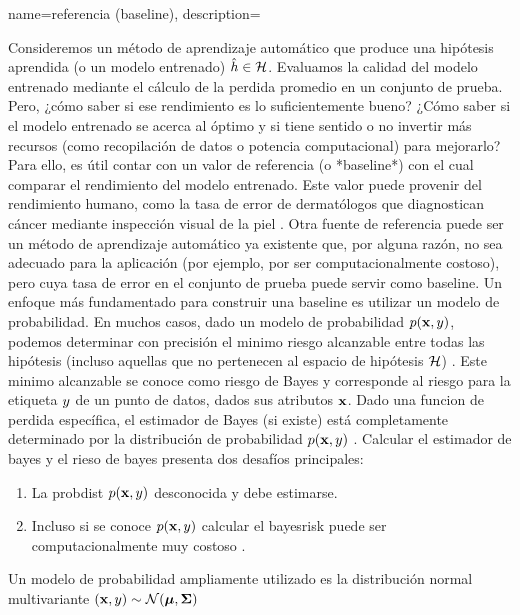 {name={referencia (baseline)},
    description={Consideremos un método de aprendizaje automático que produce una 
    hipótesis aprendida (o un modelo entrenado) $\hat{h} \in \mathcal{H}$.
	Evaluamos la calidad del modelo entrenado  
	mediante el cálculo de la perdida promedio en un conjunto de prueba. Pero, ¿cómo saber si ese rendimiento es lo suficientemente bueno?
	¿Cómo saber si el modelo entrenado se acerca al óptimo y si tiene sentido o no invertir más recursos (como recopilación de datos o potencia computacional) para mejorarlo? 
    Para ello, es útil contar con un valor de referencia (o *baseline*) con el cual comparar el rendimiento  
    del modelo entrenado. Este valor puede provenir del rendimiento humano,
    como la tasa de error de dermatólogos que diagnostican cáncer mediante inspección visual de la piel \cite{SkinHumanAI}.
	Otra fuente de referencia puede ser un método de aprendizaje automático ya existente que, por alguna razón, no sea adecuado para la aplicación (por ejemplo, por ser computacionalmente costoso), pero cuya tasa de error en el conjunto de prueba puede servir como baseline.
	Un enfoque más fundamentado para construir una baseline es utilizar un modelo de probabilidad. En muchos casos, dado un modelo de probabilidad $p({\bf x},y)$,  
    podemos determinar con precisión el minimo riesgo alcanzable entre todas las hipótesis (incluso aquellas que no pertenecen al espacio de hipótesis $\mathcal{H}$) \cite{LC}. 
    Este minimo alcanzable se conoce como riesgo de Bayes y corresponde al riesgo  para la etiqueta  $y$ de un punto de datos, dados sus atributos ${\bf x}$.
	Dado una funcion de perdida específica, el estimador de Bayes (si existe) está completamente determinado por la distribución de probabilidad $p({\bf x},y)$ \cite[Cap. 4]{LC}. 
    Calcular el estimador de bayes y el rieso de bayes presenta dos desafíos principales:
    \begin{enumerate}[label=\arabic*)]
    	\item La \gls{probdist} $p({\bf x},y)$ desconocida y debe estimarse.
    	\item Incluso si se conoce $p({\bf x},y)$ calcular el 
		\gls{bayesrisk} puede ser computacionalmente muy costoso \cite{cooper1990computational}.
	\end{enumerate}
	Un modelo de probabilidad ampliamente utilizado es la distribución normal multivariante $\left( {\bf x},y \right) \sim \mathcal{N}({\bm \mu},{\bm \Sigma})$ 
}}
